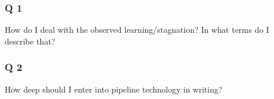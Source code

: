 \begin{frame}
	\frametitle{Q 1}
	How do I deal with the observed learning/stagnation? In what terms do I describe that?
\end{frame}

\begin{frame}
	\frametitle{Q 2}
	How deep should I enter into pipeline technology in writing?
\end{frame}